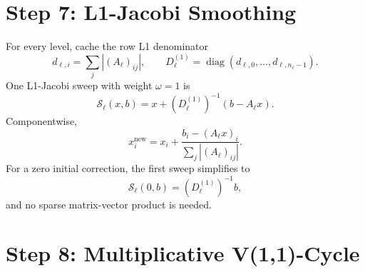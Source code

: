 \documentclass[11pt]{article}
\newcommand{\abs}[1]{\left\lvert #1 \right\rvert}
\newcommand{\level}{\ell}
\DeclareMathOperator{\diag}{diag}
\begin{document}
\section{Step 7: L1-Jacobi Smoothing}

For every level, cache the row L1 denominator
\begin{equation}
  d_{\level,i}
  =
  \sum_j\abs{(A_\level)_{ij}},
  \qquad
  D_\level^{(1)}
  =
  \diag(d_{\level,0},\ldots,d_{\level,n_\level-1}).
  \label{eq:l1-diagonal}
\end{equation}
One L1-Jacobi sweep with weight $\omega=1$ is
\begin{equation}
  \mathcal S_\level(x,b)
  =
  x+
  \left(D_\level^{(1)}\right)^{-1}
  (b-A_\level x).
  \label{eq:l1-jacobi}
\end{equation}
Componentwise,
\begin{equation}
  x_i^{\mathrm{new}}
  =
  x_i+
  \frac{b_i-(A_\level x)_i}
       {\sum_j\abs{(A_\level)_{ij}}}.
  \label{eq:l1-jacobi-component}
\end{equation}
For a zero initial correction, the first sweep simplifies to
\begin{equation}
  \mathcal S_\level(0,b)
  =
  \left(D_\level^{(1)}\right)^{-1}b,
  \label{eq:zero-guess-smoother}
\end{equation}
and no sparse matrix-vector product is needed.

\section{Step 8: Multiplicative V(1,1)-Cycle}
\end{document}
